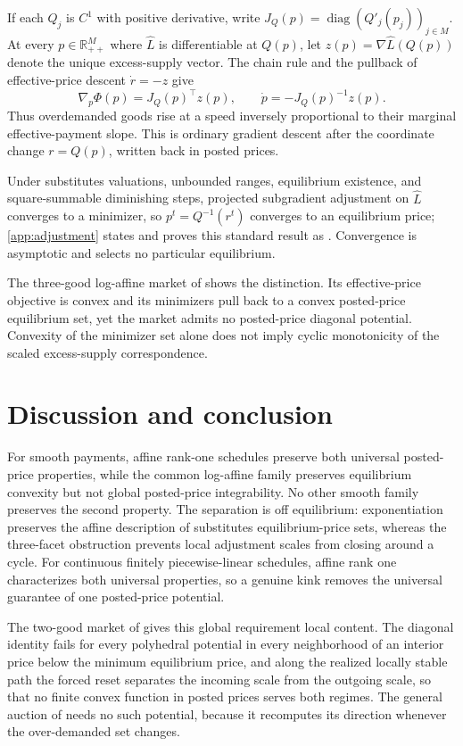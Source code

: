 \documentclass[11pt,a4paper,fleqn]{article}
\theoremstyle{plain}
\theoremstyle{definition}
\newcommand{\R}{\mathbb{R}}
\newcommand{\diag}{\operatorname{diag}}
\begin{document}
If each $Q_j$ is $C^1$ with positive derivative, write $J_Q(p)=\diag(Q'_j(p_j))_{j\in M}$. At every $p\in\R_{++}^M$ where $\widehat L$ is differentiable at $Q(p)$, let $z(p)=\nabla\widehat L(Q(p))$ denote the unique excess-supply vector. The chain rule and the pullback of effective-price descent $\dot r=-z$ give
\begin{equation}\label{eq:smooth-pullback}
\nabla_p\Phi(p)=J_Q(p)^\top z(p),
\qquad
\dot p=-J_Q(p)^{-1}z(p).
\end{equation}
Thus overdemanded goods rise at a speed inversely proportional to their marginal effective-payment slope. This is ordinary gradient descent after the coordinate change $r=Q(p)$, written back in posted prices.

Under substitutes valuations, unbounded ranges, equilibrium existence, and square-summable diminishing steps, projected subgradient adjustment on $\widehat L$ converges to a minimizer, so $p^t=Q^{-1}(r^t)$ converges to an equilibrium price; \ref{app:adjustment} states and proves this standard result as . Convergence is asymptotic and selects no particular equilibrium.

The three-good log-affine market of  shows the distinction. Its effective-price objective is convex and its minimizers pull back to a convex posted-price equilibrium set, yet the market admits no posted-price diagonal potential. Convexity of the minimizer set alone does not imply cyclic monotonicity of the scaled excess-supply correspondence.

\section{Discussion and conclusion}\label{sec:discussion}

For smooth payments, affine rank-one schedules preserve both universal posted-price properties, while the common log-affine family preserves equilibrium convexity but not global posted-price integrability. No other smooth family preserves the second property. The separation is off equilibrium: exponentiation preserves the affine description of substitutes equilibrium-price sets, whereas the three-facet obstruction prevents local adjustment scales from closing around a cycle. For continuous finitely piecewise-linear schedules, affine rank one characterizes both universal properties, so a genuine kink removes the universal guarantee of one posted-price potential.

The two-good market of  gives this global requirement local content. The diagonal identity fails for every polyhedral potential in every neighborhood of an interior price below the minimum equilibrium price, and along the realized locally stable path the forced reset separates the incoming scale from the outgoing scale, so that no finite convex function in posted prices serves both regimes. The general auction of \citet{okisato2026} needs no such potential, because it recomputes its direction whenever the over-demanded set changes.
\end{document}
